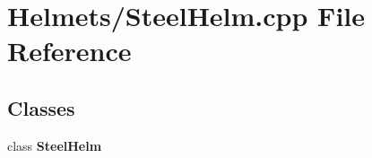 \section{Helmets/\-Steel\-Helm.cpp File Reference}
\label{_steel_helm_8cpp}
\subsection*{Classes}
\begin{DoxyCompactItemize}
\item 
class {\bf Steel\-Helm}
\end{DoxyCompactItemize}
